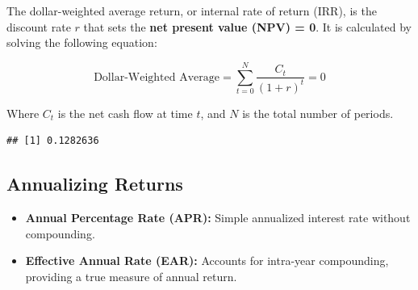\documentclass[
]{book}
\newenvironment{Shaded}{\begin{snugshade}}{\end{snugshade}}
\newcommand{\CommentTok}[1]{\textcolor[rgb]{0.56,0.35,0.01}{\textit{#1}}}
\newcommand{\ControlFlowTok}[1]{\textcolor[rgb]{0.13,0.29,0.53}{\textbf{#1}}}
\newcommand{\DecValTok}[1]{\textcolor[rgb]{0.00,0.00,0.81}{#1}}
\newcommand{\FunctionTok}[1]{\textcolor[rgb]{0.13,0.29,0.53}{\textbf{#1}}}
\newcommand{\NormalTok}[1]{#1}
\newcommand{\OtherTok}[1]{\textcolor[rgb]{0.56,0.35,0.01}{#1}}
\newcommand{\SpecialCharTok}[1]{\textcolor[rgb]{0.81,0.36,0.00}{\textbf{#1}}}
\providecommand{\tightlist}{%
  \setlength{\itemsep}{0pt}\setlength{\parskip}{0pt}}
\begin{document}
The dollar-weighted average return, or internal rate of return (IRR), is
the discount rate \(r\) that sets the \textbf{net present value (NPV) =
0}. It is calculated by solving the following equation:

\[ \text{Dollar-Weighted Average} = \sum_{t=0}^{N} \frac{C_t}{(1 + r)^t} = 0 \]

Where \(C_t\) is the net cash flow at time \(t\), and \(N\) is the total
number of periods.

\begin{Shaded}
\end{Shaded}

\begin{verbatim}
## [1] 0.1282636
\end{verbatim}

\hypertarget{annualizing-returns}{%
\subsection{Annualizing Returns}\label{annualizing-returns}}

\begin{itemize}
\tightlist
\item
  \textbf{Annual Percentage Rate (APR):} Simple annualized interest rate
  without compounding.
\item
  \textbf{Effective Annual Rate (EAR):} Accounts for intra-year
  compounding, providing a true measure of annual return.
\end{itemize}
\end{document}

